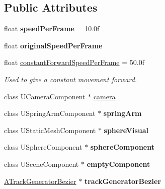 \subsection*{Public Attributes}
\begin{DoxyCompactItemize}
\item 
\mbox{\label{class_a_temp_player_a77c591dff2e42fab6fdd70ec46b5bda3}} 
float {\bfseries speed\+Per\+Frame} = 10.\+0f
\item 
\mbox{\label{class_a_temp_player_ad940076719a041aa4ce0e164174fdfdb}} 
float {\bfseries original\+Speed\+Per\+Frame}
\item 
\mbox{\label{class_a_temp_player_aad3e6f2d0f7320dce97ec66c41ef01a8}} 
float \mbox{\hyperlink{class_a_temp_player_aad3e6f2d0f7320dce97ec66c41ef01a8}{constant\+Forward\+Speed\+Per\+Frame}} = 50.\+0f
\begin{DoxyCompactList}\small\item\em Used to give a constant movement forward. \end{DoxyCompactList}\item 
class U\+Camera\+Component $\ast$ \mbox{\hyperlink{class_a_temp_player_a087ae8167b171f1f62c892cc1fcccaf0}{camera}}
\item 
\mbox{\label{class_a_temp_player_af91019d0131cd7d971da9eb0d0e8e061}} 
class U\+Spring\+Arm\+Component $\ast$ {\bfseries spring\+Arm}
\item 
\mbox{\label{class_a_temp_player_ae581707fc2b5d56470b683e1871d6931}} 
class U\+Static\+Mesh\+Component $\ast$ {\bfseries sphere\+Visual}
\item 
\mbox{\label{class_a_temp_player_a2b10a92ce2ae4f6d9eb2cd3668b78a56}} 
class U\+Sphere\+Component $\ast$ {\bfseries sphere\+Component}
\item 
\mbox{\label{class_a_temp_player_a607b126372d12e26ac43b3c33020d263}} 
class U\+Scene\+Component $\ast$ {\bfseries empty\+Component}
\item 
\mbox{\label{class_a_temp_player_a07c141a150f2983259fd476ea7761389}} 
\mbox{\hyperlink{class_a_track_generator_bezier}{A\+Track\+Generator\+Bezier}} $\ast$ {\bfseries track\+Generator\+Bezier}

\end{DoxyCompactItemize}
